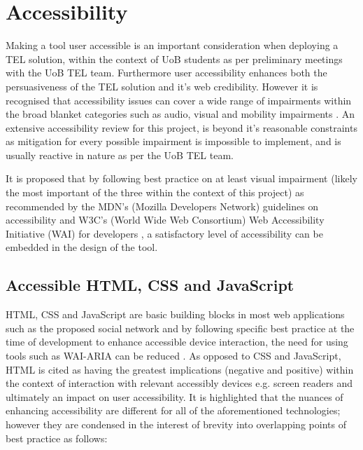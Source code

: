 \section{Accessibility}

Making a tool user accessible is an important consideration when deploying a TEL solution, within the context of UoB students as per preliminary meetings with the UoB TEL team. Furthermore user accessibility enhances both the persuasiveness of the TEL solution and it's web credibility. However it is recognised that accessibility issues can cover a wide range of impairments within the broad blanket categories such as audio, visual and mobility impairments \cite{Mills2015}. An extensive accessibility review for this project, is beyond it's reasonable constraints as mitigation for every possible impairment is impossible to implement, and is usually reactive in nature as per the UoB TEL team.

It is proposed that by following best practice on at least visual impairment (likely the most important of the three within the context of this project) as recommended by the MDN's (Mozilla Developers Network) guidelines \cite{Mills2015,Mills2016} on accessibility and W3C's (World Wide Web Consortium) Web Accessibility Initiative (WAI) for developers \cite{W3C}, a satisfactory level of accessibility can be embedded in the design of the tool.

\subsection{Accessible HTML, CSS and JavaScript}

HTML, CSS and JavaScript are basic building blocks in most web applications such as the proposed social network and by following specific best practice at the time of development to enhance accessible device interaction, the need for using tools such as WAI-ARIA can be reduced \cite{W3C,OWASP,Mills2015,Mills2016}. As opposed to CSS and JavaScript, HTML is cited as having the greatest implications (negative and positive)  within the context of interaction with relevant accessibly devices e.g. screen readers \cite{Mills,Mills2017} and ultimately an impact on user accessibility.  It is highlighted that the nuances of enhancing accessibility are different for all of the aforementioned technologies; however they are condensed in the interest of brevity into overlapping points of best practice as follows:


